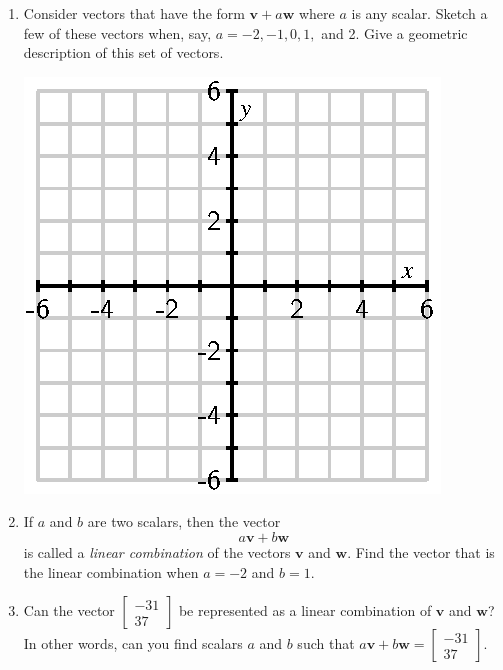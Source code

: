\documentclass[12pt]{article}
\newcommand{\vs}[1]{\vspace{#1in}}
\newcommand{\vvec}{{\mathbf v}}
\newcommand{\wvec}{{\mathbf w}}
\newcommand{\twovec}[2]{\left[\begin{array}{r}#1 \\ #2
    \end{array}\right]}
\begin{document}
\begin{enumerate}
\item Consider vectors that have the form $\vvec+a\wvec$ where $a$ is
  any scalar. Sketch a few of these vectors when, say, $a=−2,−1,0,1,$ and
  2. Give a geometric description of this set of vectors.  

  \bigskip
  \includegraphics{empty-6.eps}

\item If $a$ and $b$ are two scalars, then the vector
  $$
  a\vvec+b\wvec
  $$
  is called a {\em linear combination} of the vectors $\vvec$ and
  $\wvec$.  Find the vector that is the linear combination when $a=-2$
  and $b=1$.

  \vs{1.5}
\item Can the vector $\twovec{-31}{37}$ be represented as a linear
  combination of $\vvec$ and $\wvec$?  In other words, can you find
  scalars $a$ and $b$ such that $a\vvec + b\wvec = \twovec{-31}{37}$. 

\end{enumerate}
\end{document}
